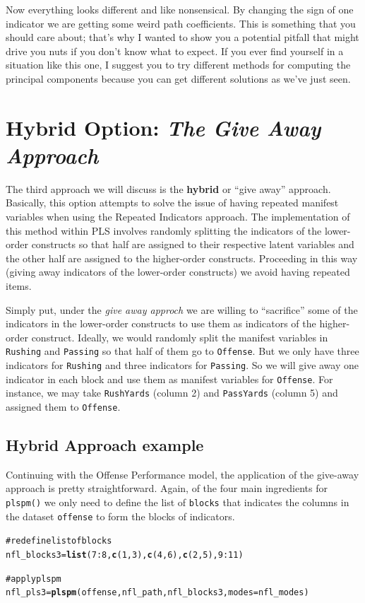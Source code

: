 \documentclass[12pt]{book}\usepackage{graphicx, color}
\makeatletter
\newcommand{\hlfunctioncall}[1]{\textcolor[rgb]{0.501960784313725,0,0.329411764705882}{\textbf{#1}}}%
\newcommand{\hlcomment}[1]{\textcolor[rgb]{0.180392156862745,0.6,0.341176470588235}{#1}}%
\newenvironment{kframe}{%
 \def\at@end@of@kframe{}%
 \ifinner\ifhmode%
  \def\at@end@of@kframe{\end{minipage}}%
  \begin{minipage}{\columnwidth}%
 \fi\fi%
 \def\FrameCommand##1{\hskip\@totalleftmargin \hskip-\fboxsep
 \colorbox{shadecolor}{##1}\hskip-\fboxsep
     \hskip-\linewidth \hskip-\@totalleftmargin \hskip\columnwidth}%
 \MakeFramed {\advance\hsize-\width
   \@totalleftmargin\z@ \linewidth\hsize
   \@setminipage}}%
 {\par\unskip\endMakeFramed%
 \at@end@of@kframe}
\newenvironment{knitrout}{}{} %
\newcommand{\fplspm}{\texttt{plspm()}}
\newcommand{\code}[1]{\texttt{#1}}
\makeatother
\begin{document}
Now everything looks different and like nonsensical. By changing the sign of one indicator we are getting some weird path coefficients. This is something that you should care about; that's why I wanted to show you a potential pitfall that might drive you nuts if you don't know what to expect. If you ever find yourself in a situation like this one, I suggest you to try different methods for computing the principal components because you can get different solutions as we've just seen.




\section{Hybrid Option: \textit{The Give Away Approach}}
The third approach we will discuss is the \textbf{hybrid} or ``give away'' approach. Basically, this option attempts to solve the issue of having repeated manifest variables when using the Repeated Indicators approach. The implementation of this method within PLS involves randomly splitting the indicators of the lower-order constructs so that half are assigned to their respective latent variables and the other half are assigned to the higher-order constructs. Proceeding in this way (giving away indicators of the lower-order constructs) we avoid having repeated items. 

Simply put, under the \textit{give away approch} we are willing to ``sacrifice'' some of the indicators in the lower-order constructs to use them as indicators of the higher-order construct. Ideally, we would randomly split the manifest variables in \code{Rushing} and \code{Passing} so that half of them go to \code{Offense}. But we only have three indicators for \code{Rushing} and three indicators for \code{Passing}. So we will give away one indicator in each block and use them as manifest variables for \code{Offense}. For instance, we may take \code{RushYards} (column 2) and \code{PassYards} (column 5) and assigned them to \code{Offense}.


\subsection{Hybrid Approach example}
Continuing with the Offense Performance model, the application of the give-away approach is pretty straightforward. Again, of the four main ingredients for \fplspm{} we only need to define the list of \code{blocks} that indicates the columns in the dataset \code{offense} to form the blocks of indicators.
\begin{knitrout}
\color{fgcolor}\begin{kframe}
\begin{alltt}
\hlcomment{# redefine list of blocks}
nfl_blocks3 = \hlfunctioncall{list}(7:8, \hlfunctioncall{c}(1, 3), \hlfunctioncall{c}(4, 6), \hlfunctioncall{c}(2, 5), 9:11)

\hlcomment{# apply plspm}
nfl_pls3 = \hlfunctioncall{plspm}(offense, nfl_path, nfl_blocks3, modes = nfl_modes)
\end{alltt}
\end{kframe}
\end{knitrout}
\end{document}
